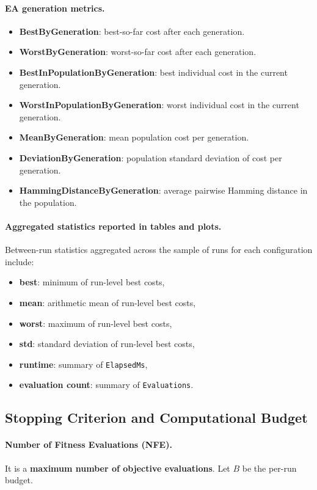 \documentclass[12pt,a4paper]{report}
\begin{document}
\paragraph{EA generation metrics.}
\begin{itemize}
    \item \textbf{BestByGeneration}: best-so-far cost after each generation.
    \item \textbf{WorstByGeneration}:  worst-so-far cost after each generation.
    \item \textbf{BestInPopulationByGeneration}: best individual cost in the current generation.
    \item \textbf{WorstInPopulationByGeneration}: worst individual cost in the current generation.
    \item \textbf{MeanByGeneration}: mean population cost per generation.
    \item \textbf{DeviationByGeneration}: population standard deviation of cost per generation.
    \item \textbf{HammingDistanceByGeneration}: average pairwise Hamming distance in the population.
\end{itemize}


\paragraph{Aggregated statistics reported in tables and plots.}
Between-run statistics aggregated across the sample of runs for each configuration include:
\begin{itemize}
    \item \textbf{best}: minimum of run-level best costs,
    \item \textbf{mean}: arithmetic mean of run-level best costs,
    \item \textbf{worst}: maximum of run-level best costs,
    \item \textbf{std}: standard deviation of run-level best costs,
    \item \textbf{runtime}: summary of \texttt{ElapsedMs},
    \item \textbf{evaluation count}: summary of \texttt{Evaluations}.
\end{itemize}

\subsection{Stopping Criterion and Computational Budget}

\paragraph{Number of Fitness Evaluations (NFE).} It is a \textbf{maximum number of objective evaluations}. Let \(B\) be the per-run budget.
\end{document}
